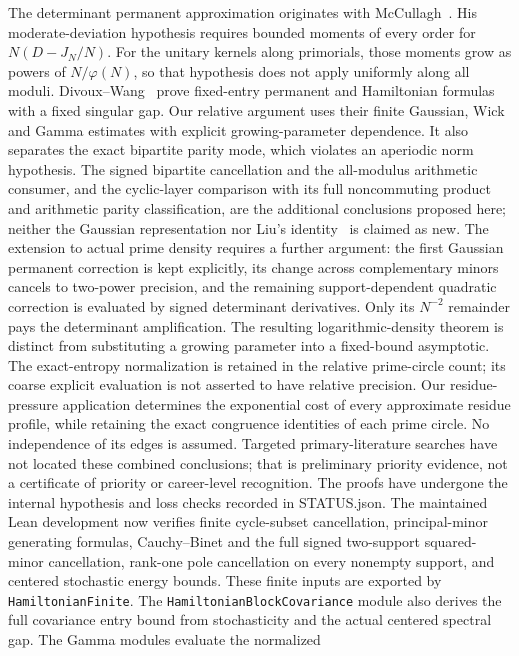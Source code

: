 \documentclass[11pt]{article}
\theoremstyle{remark}
\begin{document}
The determinant permanent approximation originates with
McCullagh~\cite{McC}. His moderate-deviation hypothesis requires
bounded moments of every order for \(N(D-J_N/N)\).
For the unitary kernels along primorials, those moments grow
as powers of \(N/\varphi(N)\), so that hypothesis does not
apply uniformly along all moduli.
Divoux--Wang~\cite{DW} prove fixed-entry permanent and
Hamiltonian formulas with a fixed singular gap.
Our relative argument uses their finite Gaussian, Wick and
Gamma estimates with explicit growing-parameter dependence.
It also separates the exact bipartite parity mode, which
violates an aperiodic norm hypothesis.
The signed bipartite cancellation and the all-modulus arithmetic
consumer, and the cyclic-layer comparison with its full
noncommuting product and arithmetic parity classification,
are the additional conclusions proposed here;
neither the Gaussian representation nor Liu's identity~\cite{Liu}
is claimed as new.
The extension to actual prime density requires a further argument:
the first Gaussian permanent correction is kept explicitly,
its change across complementary minors cancels to two-power
precision, and the remaining support-dependent quadratic
correction is evaluated by signed determinant derivatives.
Only its \(N^{-2}\) remainder pays the determinant amplification.
The resulting logarithmic-density theorem is distinct from
substituting a growing parameter into a fixed-bound asymptotic.
The exact-entropy normalization is retained in the relative
prime-circle count; its coarse explicit evaluation is not
asserted to have relative precision.
Our residue-pressure application determines the exponential
cost of every approximate residue profile, while retaining
the exact congruence identities of each prime circle.
No independence of its edges is assumed.
Targeted primary-literature searches have not located these
combined conclusions; that is preliminary priority evidence,
not a certificate of priority or career-level recognition.
The proofs have undergone the internal hypothesis and loss
checks recorded in STATUS.json. The maintained Lean development
now verifies finite cycle-subset cancellation, principal-minor
generating formulas, Cauchy--Binet and the full signed two-support
squared-minor cancellation, rank-one pole cancellation on every
nonempty support, and centered stochastic energy bounds.
These finite inputs are exported by \texttt{HamiltonianFinite}.
The \texttt{HamiltonianBlockCovariance} module also derives the
full covariance entry bound from stochasticity and the actual
centered spectral gap. The Gamma modules evaluate the normalized
\end{document}
